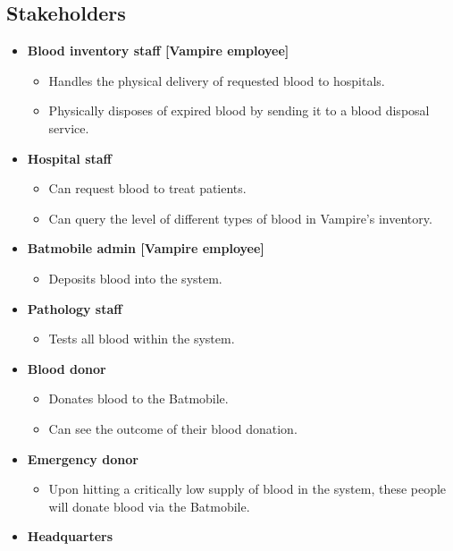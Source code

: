 \documentclass{article}
\begin{document}
\subsection{Stakeholders}
\begin{itemize}
    \item \textbf{Blood inventory staff [Vampire employee]}
        \begin{itemize}
            \item Handles the physical delivery of requested blood to hospitals.
            \item Physically disposes of expired blood by sending it to a blood disposal service.
        \end{itemize}
    \item \textbf{Hospital staff}
        \begin{itemize}
            \item Can request blood to treat patients.
            \item Can query the level of different types of blood in Vampire’s inventory.
        \end{itemize}
    \item \textbf{Batmobile admin [Vampire employee]}
        \begin{itemize}
            \item Deposits blood into the system.
        \end{itemize}
    \item \textbf{Pathology staff}
        \begin{itemize}
            \item Tests all blood within the system.
        \end{itemize}
    \item \textbf{Blood donor}
        \begin{itemize}
            \item Donates blood to the Batmobile.
            \item Can see the outcome of their blood donation.
        \end{itemize}
    \item \textbf{Emergency donor}
        \begin{itemize}
            \item Upon hitting a critically low supply of blood in the system, these people will donate blood via the Batmobile.
        \end{itemize}
    \item \textbf{Headquarters}
        \begin{itemize}

\end{itemize}
\end{itemize}
\end{document}
